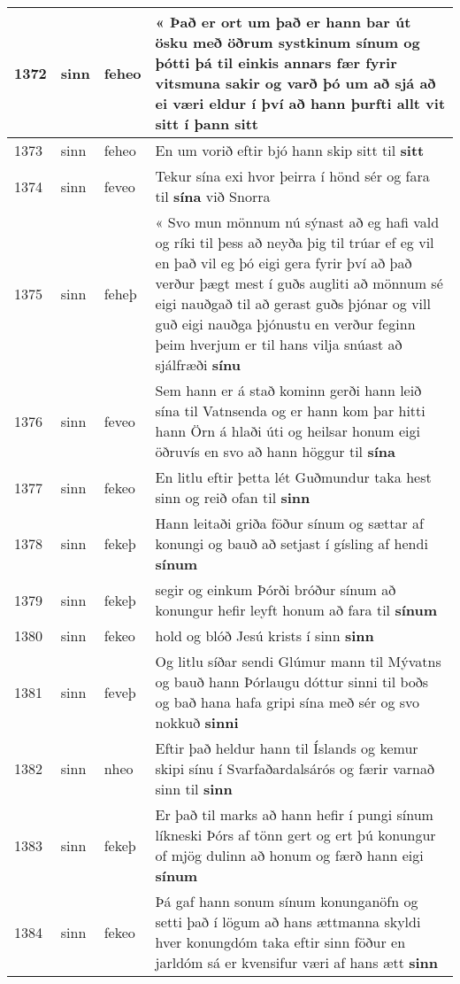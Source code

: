 \documentclass{article}
\begin{document}
\begin{longtable}{p{1cm}|p{1cm}|p{1cm}|p{13cm}}
\hline
1372&sinn&feheo&« Það er ort um það er hann bar út ösku með öðrum systkinum sínum og þótti þá til einkis annars fær fyrir vitsmuna sakir og varð þó um að sjá að ei væri eldur í því að hann þurfti allt vit sitt í þann \textbf{sitt} \\
\hline
1373&sinn&feheo&En um vorið eftir bjó hann skip sitt til \textbf{sitt} \\
\hline
1374&sinn&feveo&Tekur sína exi hvor þeirra í hönd sér og fara til \textbf{sína} við Snorra\\
\hline
1375&sinn&feheþ&« Svo mun mönnum nú sýnast að eg hafi vald og ríki til þess að neyða þig til trúar ef eg vil en það vil eg þó eigi gera fyrir því að það verður þægt mest í guðs augliti að mönnum sé eigi nauðgað til að gerast guðs þjónar og vill guð eigi nauðga þjónustu en verður feginn þeim hverjum er til hans vilja snúast að sjálfræði \textbf{sínu} \\
\hline
1376&sinn&feveo&Sem hann er á stað kominn gerði hann leið sína til Vatnsenda og er hann kom þar hitti hann Örn á hlaði úti og heilsar honum eigi öðruvís en svo að hann höggur til \textbf{sína} \\
\hline
1377&sinn&fekeo&En litlu eftir þetta lét Guðmundur taka hest sinn og reið ofan til \textbf{sinn} \\
\hline
1378&sinn&fekeþ&Hann leitaði griða föður sínum og sættar af konungi og bauð að setjast í gísling af hendi \textbf{sínum} \\
\hline
1379&sinn&fekeþ&segir og einkum Þórði bróður sínum að konungur hefir leyft honum að fara til \textbf{sínum} \\
\hline
1380&sinn&fekeo&hold og blóð Jesú krists í sinn \textbf{sinn} \\
\hline
1381&sinn&feveþ&Og litlu síðar sendi Glúmur mann til Mývatns og bauð hann Þórlaugu dóttur sinni til boðs og bað hana hafa gripi sína með sér og svo nokkuð \textbf{sinni} \\
\hline
1382&sinn&nheo&Eftir það heldur hann til Íslands og kemur skipi sínu í Svarfaðardalsárós og færir varnað sinn til \textbf{sinn} \\
\hline
1383&sinn&fekeþ&Er það til marks að hann hefir í pungi sínum líkneski Þórs af tönn gert og ert þú konungur of mjög dulinn að honum og færð hann eigi \textbf{sínum} \\
\hline
1384&sinn&fekeo&Þá gaf hann sonum sínum konunganöfn og setti það í lögum að hans ættmanna skyldi hver konungdóm taka eftir sinn föður en jarldóm sá er kvensifur væri af hans ætt \textbf{sinn} \\

\end{longtable}
\end{document}
